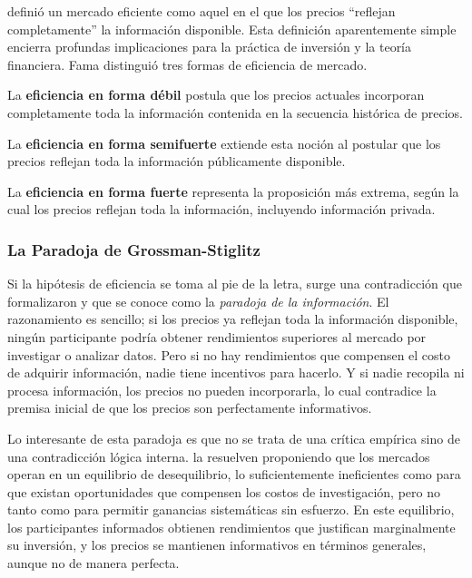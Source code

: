 ﻿\documentclass[11pt,a4paper]{article}
\begin{document}
\citet{fama1970} defini\'o un mercado eficiente como aquel en el que los precios ``reflejan completamente'' la informaci\'on disponible. Esta definici\'on aparentemente simple encierra profundas implicaciones para la pr\'actica de inversi\'on y la teor\'ia financiera. Fama distingui\'o tres formas de eficiencia de mercado.

La \textbf{eficiencia en forma d\'ebil} postula que los precios actuales incorporan completamente toda la informaci\'on contenida en la secuencia hist\'orica de precios.

La \textbf{eficiencia en forma semifuerte} extiende esta noci\'on al postular que los precios reflejan toda la informaci\'on p\'ublicamente disponible.

La \textbf{eficiencia en forma fuerte} representa la proposici\'on m\'as extrema, seg\'un la cual los precios reflejan toda la informaci\'on, incluyendo informaci\'on privada.

\subsubsection{La Paradoja de Grossman-Stiglitz}

Si la hip\'otesis de eficiencia se toma al pie de la letra, surge una contradicci\'on que \citet{grossman1980} formalizaron y que se conoce como la \textit{paradoja de la informaci\'on}. El razonamiento es sencillo; si los precios ya reflejan toda la informaci\'on disponible, ning\'un participante podr\'ia obtener rendimientos superiores al mercado por investigar o analizar datos. Pero si no hay rendimientos que compensen el costo de adquirir informaci\'on, nadie tiene incentivos para hacerlo. Y si nadie recopila ni procesa informaci\'on, los precios no pueden incorporarla, lo cual contradice la premisa inicial de que los precios son perfectamente informativos.

Lo interesante de esta paradoja es que no se trata de una cr\'itica emp\'irica sino de una contradicci\'on l\'ogica interna. \citet{grossman1980} la resuelven proponiendo que los mercados operan en un equilibrio de desequilibrio, lo suficientemente ineficientes como para que existan oportunidades que compensen los costos de investigaci\'on, pero no tanto como para permitir ganancias sistem\'aticas sin esfuerzo. En este equilibrio, los participantes informados obtienen rendimientos que justifican marginalmente su inversi\'on, y los precios se mantienen informativos en t\'erminos generales, aunque no de manera perfecta.
\end{document}
